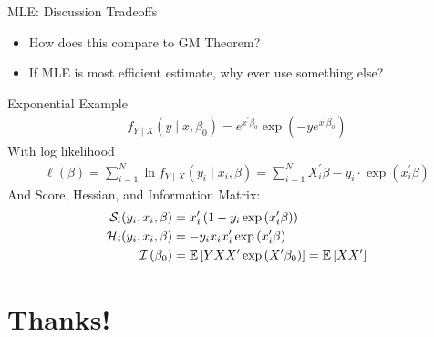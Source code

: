 \begin{frame}{MLE: Discussion}
Tradeoffs
\begin{itemize}
\item How does this compare to GM Theorem?
\item If MLE is most efficient estimate, why ever use something else?
\end{itemize}
\end{frame}


\begin{frame}{Exponential Example}
\begin{align*}
f _ { Y \mid X } ( y \mid x , \beta _ { 0 } ) =  { e } ^ { x ^ { \prime } \beta _ { 0 } } \exp \left( - y  { e } ^ { x ^ { \prime } \beta _ { 0 } } \right)
\end{align*}
With log likelihood
\begin{align*}
\ell( \beta ) = \sum _ { i = 1 } ^ { N } \ln f _ { Y \mid X } \left( y _ { i } \mid x _ { i } , \beta \right) = \sum _ { i = 1 } ^ { N } X _ { i } ^ { \prime } \beta - y _ { i } \cdot \exp \left( x _ { i } ^ { \prime } \beta \right)
\end{align*}
And Score, Hessian, and Information Matrix:
\begin{align*}
\mathcal { S }_i ( y_i, x_i , \beta ) &= x_i ^ { \prime } \left( 1 - y_i \exp \left( x_i ^ { \prime } \beta \right) \right)\\
\mathcal { H }_i ( y_i , x_i , \beta ) &= - y_i x_i x_i ^ { \prime } \exp \left( x_i ^ { \prime } \beta \right)\\
\mathcal { I } \left( \beta _ { 0 } \right) &= \mathbb{E} \left[ Y X X ^ { \prime } \exp \left( X ^ { \prime } \beta _ { 0 } \right) \right] = \mathbb{E} \left[ X X ^ { \prime } \right]
\end{align*}
\end{frame}



\section*{Thanks!}


